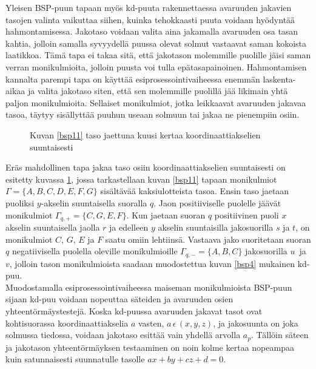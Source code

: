 \documentclass[a4paper, 12pt, titlepage]{article}
\begin{document}
Yleisen BSP-puun tapaan myös kd-puuta rakennettaessa avaruuden jakavien tasojen valinta vaikuttaa siihen, kuinka tehokkaasti puuta voidaan hyödyntää hahmontamisessa. Jakotaso voidaan valita aina jakamalla avaruuden osa tasan kahtia, jolloin samalla syvyydellä puussa olevat solmut vastaavat saman kokoista laatikkoa. Tämä tapa ei takaa sitä, että jakotason molemmille puolille jäisi saman verran monikulmioita, jolloin puusta voi tulla epätasapainoinen. Hahmontamisen kannalta parempi tapa on käyttää esiprosessointivaiheessa enemmän laskenta-aikaa ja valita jakotaso siten, että sen molemmille puolillä jää likimain yhtä paljon monikulmioita. Sellaiset monikulmiot, jotka leikkaavat avaruuden jakavaa tasoa, täytyy sisällyttää puuhun useaan solmuun tai jakaa ne pienempiin osiin. \citep[.]{havran}\\

\begin{figure}
 \centering 
 \def\svgwidth{0.9\linewidth}
 
 \caption{Kuvan \ref{bsp11} taso jaettuna kuusi kertaa koordinaattiakselien suuntaisesti}
 \vspace{-0.5cm} 
 \label{bsp3}
\end{figure}

Eräs mahdollinen tapa jakaa taso osiin koordinaattiakselien suuntaisesti on esitetty kuvassa \ref{bsp3}, jossa tarkastellaan kuvan \ref{bsp11} tapaan monikulmiot $\Gamma=\{A,B,C,D,E,F,G\}$ sisältävää kaksiulotteista tasoa. Ensin taso jaetaan puoliksi $y$-akselin suuntaisella suoralla $q$. Jaon positiiviselle puolelle jäävät monikulmiot $\Gamma_{q,+} = \{C,G,E,F\}$. Kun jaetaan suoran $q$ positiivinen puoli $x$ akselin suuntaisella jaolla $r$ ja edelleen $y$ akselin suuntaisilla jakosuorilla $s$ ja $t$, on monikulmiot $C$, $G$, $E$ ja $F$ saatu omiin lehtiinsä. Vastaava jako suoritetaan suoran $q$ negatiivisella puolella oleville monikulmioille $\Gamma_{q,-} = \{A,B,C\}$ jakosuorilla $u$ ja $v$, jolloin tason monikulmioista saadaan muodostettua kuvan \ref{bsp4} mukainen kd-puu.\\ 

Muodostamalla esiprosessointivaiheessa maiseman monikulmioista BSP-puun sijaan kd-puu voidaan nopeuttaa säteiden ja avaruuden osien yhteentörmäystestejä. Koska kd-puussa avaruuden jakavat tasot ovat kohtisuorassa koordinaattiakselia $a$ vasten, $a\,\epsilon\,(x, y, z)$, ja jakosuunta on joka solmussa tiedossa, voidaan jakotaso esittää vain yhdellä arvolla $a_p$. Tällöin säteen ja jakotason yhteentörmäyksen testaaminen on noin kolme kertaa nopeampaa kuin satunnaisesti suunnatulle tasolle $ax + by + cz + d = 0$. \citep[.]{havran}\\
\end{document}
